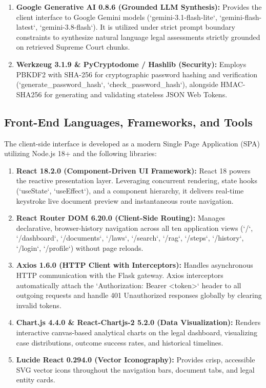 \begin{enumerate}
    \item \textbf{Google Generative AI 0.8.6 (Grounded LLM Synthesis):}
    Provides the client interface to Google Gemini models (`gemini-3.1-flash-lite`, `gemini-flash-latest`, `gemini-3.8-flash`). It is utilized under strict prompt boundary constraints to synthesize natural language legal assessments strictly grounded on retrieved Supreme Court chunks.
    
    \item \textbf{Werkzeug 3.1.9 \& PyCryptodome / Hashlib (Security):}
    Employs PBKDF2 with SHA-256 for cryptographic password hashing and verification (`generate_password_hash`, `check_password_hash`), alongside HMAC-SHA256 for generating and validating stateless JSON Web Tokens.
\end{enumerate}

\subsection{Front-End Languages, Frameworks, and Tools}
The client-side interface is developed as a modern Single Page Application (SPA) utilizing Node.js 18+ and the following libraries:

\begin{enumerate}
    \item \textbf{React 18.2.0 (Component-Driven UI Framework):}
    React 18 powers the reactive presentation layer. Leveraging concurrent rendering, state hooks (`useState`, `useEffect`), and a component hierarchy, it delivers real-time keystroke live document preview and instantaneous route navigation.
    
    \item \textbf{React Router DOM 6.20.0 (Client-Side Routing):}
    Manages declarative, browser-history navigation across all ten application views (`/`, `/dashboard`, `/documents`, `/laws`, `/search`, `/rag`, `/steps`, `/history`, `/login`, `/profile`) without page reloads.
    
    \item \textbf{Axios 1.6.0 (HTTP Client with Interceptors):}
    Handles asynchronous HTTP communication with the Flask gateway. Axios interceptors automatically attach the `Authorization: Bearer <token>` header to all outgoing requests and handle 401 Unauthorized responses globally by clearing invalid tokens.
    
    \item \textbf{Chart.js 4.4.0 \& React-Chartjs-2 5.2.0 (Data Visualization):}
    Renders interactive canvas-based analytical charts on the legal dashboard, visualizing case distributions, outcome success rates, and historical timelines.
    
    \item \textbf{Lucide React 0.294.0 (Vector Iconography):}
    Provides crisp, accessible SVG vector icons throughout the navigation bars, document tabs, and legal entity cards.
\end{enumerate}

